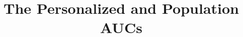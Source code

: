 \documentclass{beamer}
\title{The Personalized and Population AUCs}
\date{}
\begin{document}
\begin{frame}
  \titlepage
\end{frame}











\end{document}
